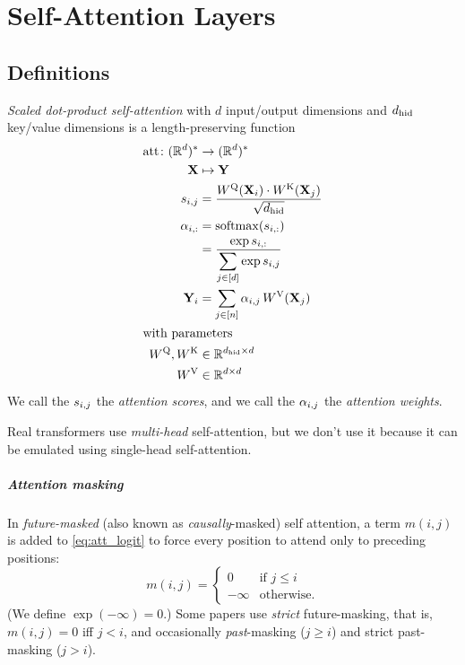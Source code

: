 %
\chapter{Self-Attention Layers}
%

\section{Definitions}

\emph{Scaled dot-product self-attention} with $d$ input/output dimensions and ${d_{\textnormal{hid}}}$ key/value dimensions is a length-preserving function
\begin{align}
  \textnormal{att} \colon (\mathbb{R}^d)^* &\to (\mathbb{R}^d)^* \notag \\
  \mathbf{X} &\mapsto \mathbf{Y} \\
  s_{i,j} &= \frac{W^{\textnormal{Q}}(\mathbf{X}_{i}) \cdot W^{\textnormal{K}}(\mathbf{X}_{j})}{\sqrt{{d_{\textnormal{hid}}}}} \label{eq:att_logit} \\
  \alpha_{i,:} &= \operatorname*{softmax}(s_{i,:}) \label{eq:att_weight} \\
  &= \frac{\exp s_{i,:}}{\displaystyle\sum_{j \in [d]} \exp s_{i,j}} \\
  \mathbf{Y}_{i} &= \sum_{j\in[n]} \alpha_{i,j} \, W^{\textnormal{V}} (\mathbf{X}_{j}) \\
  \intertext{with parameters}
  W^{\textnormal{Q}},W^{\textnormal{K}} &\in \mathbb{R}^{{d_{\textnormal{hid}}} \times d} \notag \\
  W^{\textnormal{V}} &\in \mathbb{R}^{d \times d} \notag
\end{align}
We call the $s_{i,j}$ the \emph{attention scores}, and we call the $\alpha_{i,j}$ the \emph{attention weights}.

Real transformers use \emph{multi-head} self-attention, but we don't use it because it can be emulated using single-head self-attention.

\paragraph{Attention masking} In \emph{future-masked} (also known as \emph{causally}-masked) self attention, a term $m(i,j)$ is added to \cref{eq:att_logit} to force every position to attend only to preceding positions:
\begin{equation}
    m(i,j) =
    \begin{cases}
        0 & \text{if $j \le i$} \\
        -\infty & \text{otherwise.}
    \end{cases}
\end{equation}
(We define $\exp (-\infty) = 0$.)
Some papers use \emph{strict} future-masking, that is, $m(i,j) = 0$ iff $j<i$,
and occasionally \emph{past}-masking ($j \ge i$) and strict past-masking ($j>i$).

